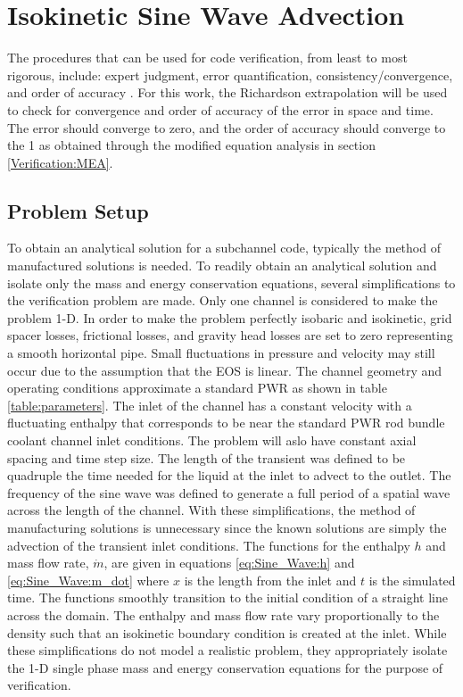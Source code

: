 \vspace*{-80mm}
\chapter{Isokinetic Sine Wave Advection} \label{chapter6:verification_1}
	    
The procedures that can be used for code verification, from least to most
rigorous, include: expert judgment, error quantification,
consistency/convergence, and order of accuracy \cite{Oberkampf2008}. For this
work, the Richardson extrapolation will be used to check for convergence and
order of accuracy of the error in space and time. The error should converge to
zero, and the order of accuracy should converge to the 1 as obtained through
the modified equation analysis in section \ref{Verification:MEA}.
 
\section{Problem Setup}


To obtain an analytical solution for a subchannel code, typically the method
of manufactured solutions \cite{SAND2000-1444} is needed. To readily obtain an
analytical solution and isolate only the mass and energy conservation equations,
several simplifications to the verification problem are made. Only one channel
is considered to make the problem 1-D. In order to make the problem perfectly
isobaric and isokinetic, grid spacer losses, frictional losses, and gravity head
losses are set to zero representing a smooth horizontal pipe. Small fluctuations
in pressure and velocity may still occur due to the assumption that the EOS is
linear. The channel geometry and operating conditions approximate a standard PWR
as shown in table \ref{table:parameters}. The inlet of the channel has a
constant velocity with a fluctuating enthalpy that corresponds to be near the
standard PWR rod bundle coolant channel inlet conditions. The problem will aslo
have constant axial spacing and time step size. The length of the
transient was defined to be quadruple the time needed for the liquid at the
inlet to advect to the outlet. The frequency of the sine wave was defined to
generate a full period of a spatial wave across the length of the channel. With
these simplifications, the method of manufacturing solutions is unnecessary
since the known solutions are simply the advection of the transient inlet
conditions. The functions for the enthalpy $h$ and mass flow rate, $\dot{m}$,
are given in equations \ref{eq:Sine_Wave:h} and \ref{eq:Sine_Wave:m_dot} where
$x$ is the length from the inlet and $t$ is the simulated time. The functions
smoothly transition to the initial condition of a straight line across the
domain. The enthalpy and mass flow rate vary proportionally to the density such
that an isokinetic boundary condition is created at the inlet. While these
simplifications do not model a realistic problem, they appropriately isolate the
1-D single phase mass and energy conservation equations for the purpose of
verification. 

